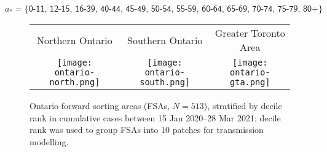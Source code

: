 \begin{equation}
  a_* = \big\{\textsf{0-11, 12-15, 16-39, 40-44, 45-49, 50-54, 55-59, 60-64, 65-69, 70-74, 75-79, 80+}\big\}
\end{equation}
\begin{figure}
  \centering
  \setlength{\tabcolsep}{0pt}
  \begin{tabular}{ccc}
    Northern Ontario & Southern Ontario & Greater Toronto Area\\
    \texttt{[image: ontario-north.png]} &
    \texttt{[image: ontario-south.png]} &
    \texttt{[image: ontario-gta.png]}
  \end{tabular}
  \caption{Ontario forward sorting areas (FSAs, $N=513$),
    stratified by decile rank in cumulative \covid cases between 15 Jan 2020--28 Mar 2021;
    decile rank was used to group FSAs into 10 patches for transmission modelling.}
  \label{fig:map}
\end{figure}
